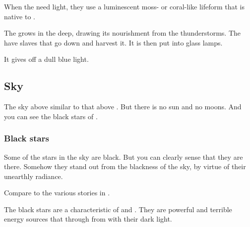 \subsubsection{\Glowmoss}
\index{\glowmoss}
When the \resphain{} need light, they use a luminescent moss- or coral-like lifeform that is native to \Nyx. 

The \glowmoss{} grows in the deep, drawing its nourishment from the thunderstorms. 
The \resphain{} have slaves that go down and harvest it. 
It is then put into glass lamps. 

It gives off a dull blue light. 









\subsection{Sky}
The sky above \Nyx{} similar to that above \Azmith.
But there is no sun and no moons. 
And you can see the black stars of \Erebos. 





\subsubsection{Black stars}
Some of the stars in the \Nyxian{} sky are black. But you can clearly sense that they are there. Somehow they stand out from the blackness of the sky, by virtue of their unearthly radiance. 

Compare to the various stories in .


The black stars are a characteristic of \Nyx{} and \Erebos. They are powerful and terrible energy sources that  through from \Erebos{} with their dark light. 

